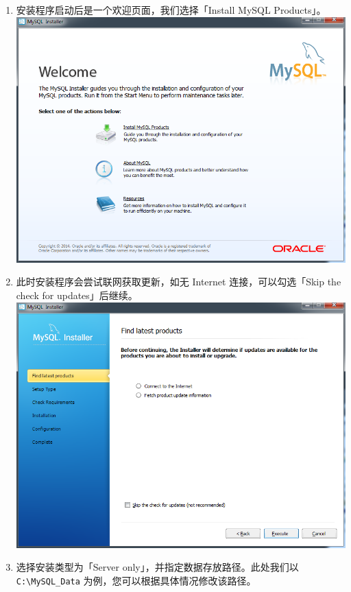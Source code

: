 \begin{enumerate}
\def\labelenumi{\arabic{enumi}.}
\itemsep1pt\parskip0pt
\item
  安装程序启动后是一个欢迎页面，我们选择「Install MySQL Products」。
  \includegraphics{../img/mysql_1.png}
\item
  此时安装程序会尝试联网获取更新，如无 Internet 连接，可以勾选「Skip the
  check for updates」后继续。 \includegraphics{../img/mysql_2.png}
\item
  选择安装类型为「Server only」，并指定数据存放路径。此处我们以
  \texttt{C:\textbackslash{}MySQL\_Data}
  为例，您可以根据具体情况修改该路径。

\end{enumerate}
